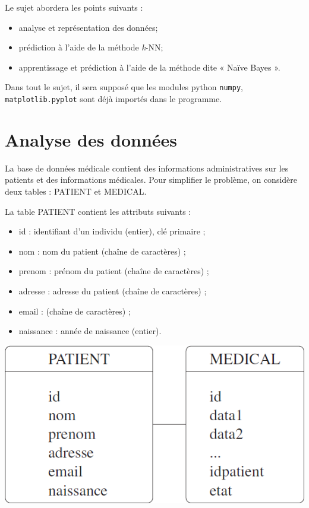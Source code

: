 Le sujet abordera les points suivants :
\begin{itemize}
\item analyse et représentation des données;
\item prédiction à l’aide de la méthode \textit{k}-NN;
\item apprentissage et prédiction à l’aide de la méthode dite « Naïve Bayes ».
\end{itemize}

Dans tout le sujet, il sera supposé que les modules python \texttt{numpy}, \texttt{matplotlib.pyplot} sont déjà
importés dans le programme.
\fi
\section{Analyse des données}
\ifprof
\else
La base de données médicale contient des informations administratives sur les patients et des informations
médicales. Pour simplifier le problème, on considère deux tables : PATIENT et MEDICAL.

\begin{minipage}[c]{.5\linewidth}
La table PATIENT contient les attributs suivants :
\begin{itemize}
\item id : identifiant d’un individu (entier), clé primaire ;
\item nom : nom du patient (chaîne de caractères) ;
\item prenom : prénom du patient (chaîne de caractères) ;
\item adresse : adresse du patient (chaîne de caractères) ;
\item email : (chaîne de caractères) ;
\item naissance : année de naissance (entier).
\end{itemize}
\end{minipage} \hfill
\begin{minipage}[c]{.45\linewidth}
\begin{center}
\includegraphics[width=.85\linewidth]{images/fig_a}
\end{center}
\end{minipage} 

